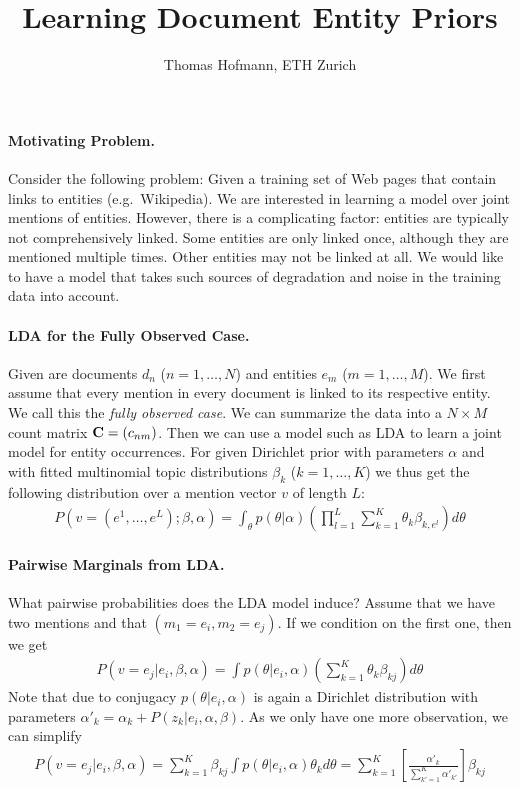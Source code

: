 \documentclass{article}
\title{Learning Document Entity Priors}
\author{Thomas Hofmann, ETH Zurich}
\newcommand{\C}{{\bf C}}
\begin{document}
\maketitle

\paragraph{Motivating Problem.} 
Consider the following problem: Given a training set of Web pages that contain links to entities (e.g.~Wikipedia). We are interested in learning a model over joint mentions of entities. However, there is a complicating factor:  entities are typically not comprehensively linked. Some entities are only linked once, although they are mentioned multiple times. Other entities may not be linked at all. We would like to have a model that takes such sources of degradation and noise in the training data into account. 

\paragraph{LDA for the Fully Observed Case.}  Given are documents $d_n$ ($n=1,\dots,N$) and  entities $e_m$ ($m=1,\dots,M$). We first assume that every mention in every document is linked to its respective entity. We call this the \textit{fully observed case}. We can summarize the data into a $N \times M$ count matrix $\C= (c_{nm})$.  Then we can use a model such as LDA to learn a joint model for entity occurrences. For given Dirichlet prior with parameters $\alpha$ and with fitted multinomial topic distributions $\beta_k$ ($k=1,\dots,K$) we thus get the following distribution over a mention vector $v$ of length $L$:
\begin{align}
P(v=(e^1,\dots,e^L); \beta, \alpha) = \int_\theta p(\theta | \alpha) \left( \prod_{l=1}^L \sum_{k=1}^K \theta_k \beta_{k,e^l}  \right) d\theta
\end{align}

\paragraph{Pairwise Marginals from LDA.}  What pairwise probabilities does the LDA model induce? Assume that we have two mentions and that $(m_1=e_i,m_2 = e_j)$.  If we condition on the first one, then we get  
\begin{align}
P(v=e_j | e_i, \beta,\alpha) = 
\int p(\theta | e_i, \alpha) \left( \sum_{k=1}^K \theta_k \beta_{kj}  \right) d\theta
\end{align} 
Note that due to conjugacy $p(\theta | e_i, \alpha)$ is again a Dirichlet distribution with parameters $\alpha'_k = \alpha_k + P(z_k|e_i, \alpha, \beta)$. As we only have one more observation, we can simplify 
\begin{align}
P(v=e_j | e_i, \beta,\alpha) = 
\sum_{k=1}^K\beta_{kj} \int p(\theta | e_i, \alpha) \theta_k d \theta 
 = \sum_{k=1}^K \left[ \frac{\alpha'_k}{\sum_{k'=1}^K \alpha'_{k'}}\right]  \beta_{kj} 
\end{align} 
\end{document}
